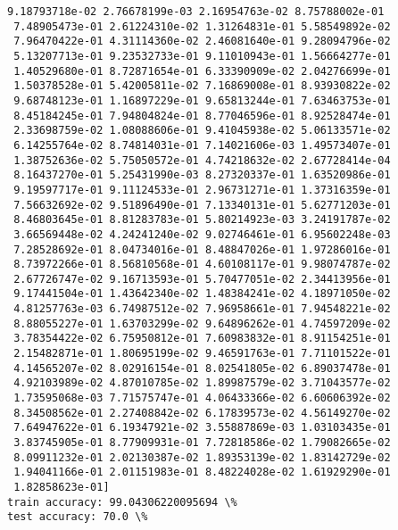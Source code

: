 \documentclass[11pt]{article}
\begin{document}
\begin{Verbatim}[commandchars=\\\{\}]
 9.18793718e-02 2.76678199e-03 2.16954763e-02 8.75788002e-01
 7.48905473e-01 2.61224310e-02 1.31264831e-01 5.58549892e-02
 7.96470422e-01 4.31114360e-02 2.46081640e-01 9.28094796e-02
 5.13207713e-01 9.23532733e-01 9.11010943e-01 1.56664277e-01
 1.40529680e-01 8.72871654e-01 6.33390909e-02 2.04276699e-01
 1.50378528e-01 5.42005811e-02 7.16869008e-01 8.93930822e-02
 9.68748123e-01 1.16897229e-01 9.65813244e-01 7.63463753e-01
 8.45184245e-01 7.94804824e-01 8.77046596e-01 8.92528474e-01
 2.33698759e-02 1.08088606e-01 9.41045938e-02 5.06133571e-02
 6.14255764e-02 8.74814031e-01 7.14021606e-03 1.49573407e-01
 1.38752636e-02 5.75050572e-01 4.74218632e-02 2.67728414e-04
 8.16437270e-01 5.25431990e-03 8.27320337e-01 1.63520986e-01
 9.19597717e-01 9.11124533e-01 2.96731271e-01 1.37316359e-01
 7.56632692e-02 9.51896490e-01 7.13340131e-01 5.62771203e-01
 8.46803645e-01 8.81283783e-01 5.80214923e-03 3.24191787e-02
 3.66569448e-02 4.24241240e-02 9.02746461e-01 6.95602248e-03
 7.28528692e-01 8.04734016e-01 8.48847026e-01 1.97286016e-01
 8.73972266e-01 8.56810568e-01 4.60108117e-01 9.98074787e-02
 2.67726747e-02 9.16713593e-01 5.70477051e-02 2.34413956e-01
 9.17441504e-01 1.43642340e-02 1.48384241e-02 4.18971050e-02
 4.81257763e-03 6.74987512e-02 7.96958661e-01 7.94548221e-02
 8.88055227e-01 1.63703299e-02 9.64896262e-01 4.74597209e-02
 3.78354422e-02 6.75950812e-01 7.60983832e-01 8.91154251e-01
 2.15482871e-01 1.80695199e-02 9.46591763e-01 7.71101522e-01
 4.14565207e-02 8.02916154e-01 8.02541805e-02 6.89037478e-01
 4.92103989e-02 4.87010785e-02 1.89987579e-02 3.71043577e-02
 1.73595068e-03 7.71575747e-01 4.06433366e-02 6.60606392e-02
 8.34508562e-01 2.27408842e-02 6.17839573e-02 4.56149270e-02
 7.64947622e-01 6.19347921e-02 3.55887869e-03 1.03103435e-01
 3.83745905e-01 8.77909931e-01 7.72818586e-02 1.79082665e-02
 8.09911232e-01 2.02130387e-02 1.89353139e-02 1.83142729e-02
 1.94041166e-01 2.01151983e-01 8.48224028e-02 1.61929290e-01
 1.82858623e-01]
train accuracy: 99.04306220095694 \%
test accuracy: 70.0 \%

    \end{Verbatim}
\end{document}
